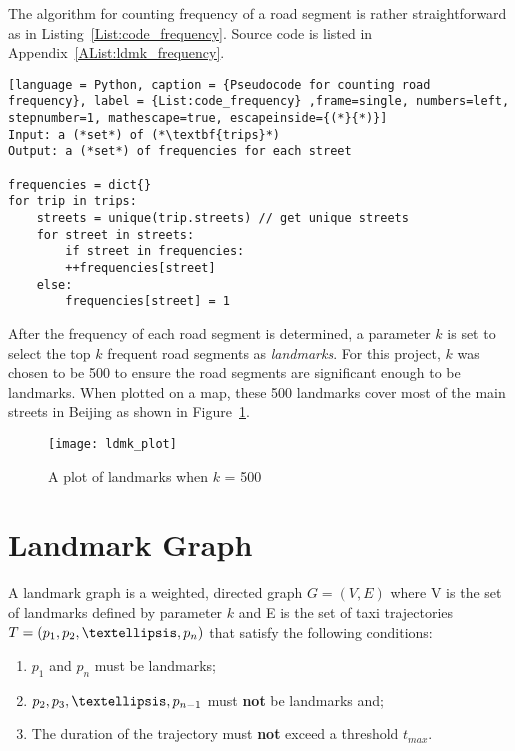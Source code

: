 The algorithm for counting frequency of a road segment is rather straightforward as in Listing~\ref{List:code_frequency}. Source code is listed in Appendix~\ref{AList:ldmk_frequency}.

\begin{lstlisting}[language = Python, caption = {Pseudocode for counting road frequency}, label = {List:code_frequency} ,frame=single, numbers=left, stepnumber=1, mathescape=true, escapeinside={(*}{*)}]
Input: a (*set*) of (*\textbf{trips}*)
Output: a (*set*) of frequencies for each street

frequencies = dict{}
for trip in trips:
    streets = unique(trip.streets) // get unique streets
    for street in streets:
    	if street in frequencies:
	    ++frequencies[street]
	else:
	    frequencies[street] = 1
\end{lstlisting}

After the frequency of each road segment is determined, a parameter $k$ is set to select the top $k$ frequent road segments as \emph{landmarks}. For this project, $k$ was chosen to be 500 to ensure the road segments are significant enough to be landmarks. When plotted on a map, these 500 landmarks cover most of the main streets in Beijing as shown in Figure~\ref{Fig:ldmk_500}. 

\begin{figure}[h]
\texttt{[image: ldmk\_plot]}
\centering
\caption{A plot of landmarks when $k$ = 500}\label{Fig:ldmk_500}
\end{figure}

\section{Landmark Graph}\label{ldmk_graph}
\begin{defn}\label{Def:ldmk_graph}
A landmark graph is a weighted, directed graph $G=(V,E)$ where V is the set of landmarks defined by parameter $k$ and E is the set of taxi trajectories $T = (p_1,p_2,\textellipsis,p_n)$ that satisfy the following conditions:
\begin{enumerate}
\item $p_1$ and $p_n$ must be landmarks; 
\item $p_2, p_3, \textellipsis , p_{n-1}$ must \textbf{not} be landmarks and;
\item The duration of the trajectory must \textbf{not} exceed a threshold $t_{max}$.
\end{enumerate}
\end{defn}

